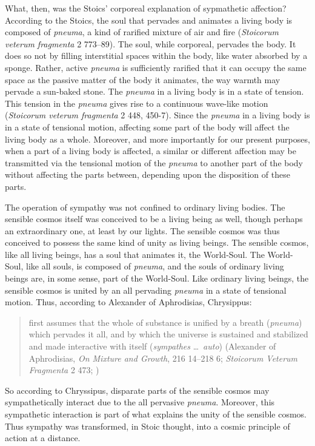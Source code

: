 What, then, was the Stoics' corporeal explanation of sypmathetic affection? According to the Stoics, the soul that pervades and animates a living body is composed of \emph{pneuma}, a kind of rarified mixture of air and fire (\emph{Stoicorum veterum fragmenta} 2 773--89). The soul, while corporeal, pervades the body. It does so not by filling interstitial spaces within the body, like water absorbed by a sponge. Rather, active \emph{pneuma} is sufficiently rarified that it  can occupy the same space as the passive matter of the body it animates, the way warmth may pervade a sun-baked stone. The \emph{pneuma} in a living body is in a state of tension. This tension in the \emph{pneuma} gives rise to a continuous wave-like motion (\emph{Stoicorum veterum fragmenta} 2 448, 450-7). Since the \emph{pneuma} in a living body is in a state of tensional motion, affecting some part of the body will affect the living body as a whole. 
Moreover, and more importantly for our present purposes, when a part of a living body is affected, a similar or different affection may be transmitted via the tensional motion of the \emph{pneuma} to another part of the body without affecting the parts between, depending upon the disposition of these parts.

The operation of sympathy was not confined to ordinary living bodies. The sensible cosmos itself was conceived to be a living being as well, though perhaps an extraordinary one, at least by our lights. The sensible cosmos was thus conceived to possess the same kind of unity as living beings. The sensible cosmos, like all living beings, has a soul that animates it, the World-Soul. The World-Soul, like all souls, is composed of \emph{pneuma}, and the souls of ordinary living beings are, in some sense, part of the World-Soul. Like ordinary living beings, the sensible cosmos is united by an all pervading \emph{pneuma} in a state of tensional motion. Thus, according to Alexander of Aphrodisias, Chrysippus: 
\begin{quote}
	first assumes that the whole of substance is unified by a breath (\emph{pneuma}) which pervades it all, and by which the universe is sustained and stabilized and made interactive with itself (\emph{sympathes} \ldots\ \emph{auto}) (Alexander of Aphrodisias, \emph{On Mixture and Growth}, 216 14--218 6; \emph{Stoicorum Veterum Fragmenta} 2 473; \citealt[48 C]{Long:1987aa})
\end{quote}
So according to Chryssipus, disparate parts of the sensible cosmos may sympathetically interact due to the all pervasive \emph{pneuma}. Moreover, this sympathetic interaction is part of what explains the unity of the sensible cosmos. Thus sympathy was transformed, in Stoic thought, into a cosmic principle of action at a distance. 

